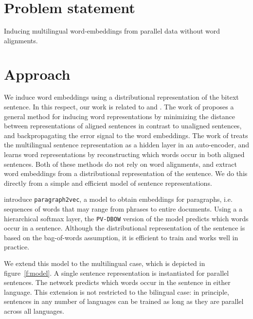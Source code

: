 \documentclass[a4paper,11pt]{article}
\begin{document}
\section*{Problem statement}

Inducing multilingual word-embeddings from parallel data without word alignments.




\section*{Approach}

We induce word embeddings using a distributional representation of the bitext sentence. In this respect, our work is related to \cite{hermann2014multilingual} and \cite{SarathChandar2014autoencoder}. The work of \cite{hermann2014multilingual} proposes a general method for inducing word representations by minimizing the distance between representations of aligned sentences in contrast to unaligned sentences, and backpropagating the error signal to the word embeddings. The work of \cite{SarathChandar2014autoencoder} treats the multilingual sentence representation as a hidden layer in an auto-encoder, and learns word representations by reconstructing which words occur in both aligned sentences. Both of these methods do not rely on word alignments, and extract word embeddings from a distributional representation of the sentence. We do this directly from a simple and efficient model of sentence representations. %


\cite{Le2014} introduce {\tt paragraph2vec}, a model to obtain embeddings for paragraphs, i.e. sequences of words that may range from phrases to entire documents. Using a a hierarchical softmax layer, the {\tt PV-DBOW} version of the model predicts which words occur in a sentence. Although the distributional representation of the sentence is based on the bag-of-words assumption, it is efficient to train and works well in practice.

We extend this model to the multilingual case, which is depicted in figure~\ref{f:model}. A single sentence representation is instantiated for parallel sentences. The network predicts which words occur in the sentence in either language. This extension is not restricted to the bilingual case: in principle, sentences in any number of languages can be trained as long as they are parallel across all languages.
\end{document}

